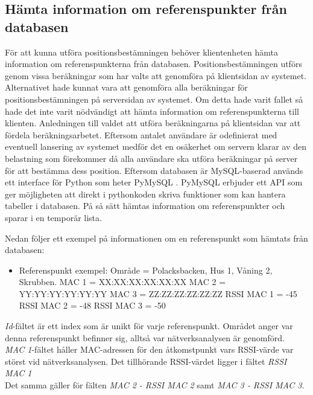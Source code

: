 \documentclass[swedish, a4paper,12pt]{article}
\begin{document}
\subsection{Hämta information om referenspunkter från databasen}\label{HamtaInfoDB}
För att kunna utföra positionsbestämningen behöver klientenheten hämta information om referenspunkterna från databasen. Positionsbestämningen utförs genom vissa beräkningar som har valts att genomföra på klientsidan av systemet. Alternativet hade kunnat vara att genomföra alla beräkningar för positionsbestämningen på serversidan av systemet. Om detta hade varit fallet så hade det inte varit nödvändigt att hämta information om referenspunkterna till klienten. Anledningen till valdet att utföra beräkningarna på klientsidan var att fördela beräkningsarbetet. Eftersom antalet användare är odefinierat med eventuell lansering av systemet medför det en osäkerhet om servern klarar av den belastning som förekommer då alla användare ska utföra beräkningar på server för att bestämma dess position. Eftersom databasen är MySQL-baserad används ett interface för Python som heter PyMySQL\cite{mysqldb}%
. PyMySQL erbjuder ett API som ger möjligheten att direkt i pythonkoden skriva funktioner som kan hantera tabeller i databasen. På så sätt hämtas information om referenspunkter och sparar i en temporär lista. %

Nedan följer ett exempel på informationen om en referenspunkt som hämtats från databasen:
\begin{itemize}
  \item Referenspunkt exempel:
        \newline Område = Polacksbacken, Hus 1, Våning 2, Skrubben.
        \newline MAC 1 = XX:XX:XX:XX:XX:XX
        \newline MAC 2 = YY:YY:YY:YY:YY:YY
        \newline MAC 3 = ZZ:ZZ:ZZ:ZZ:ZZ:ZZ
        \newline RSSI MAC 1 = -45
        \newline RSSI MAC 2 = -48
        \newline RSSI MAC 3 = -50
\end{itemize}

\textit{Id}-fältet är ett index som är unikt för varje referenspunkt. %
Området anger var denna referenspunkt befinner sig, alltså var nätverksanalysen är genomförd. \\
\textit{MAC 1}-fältet håller MAC-adressen för den åtkomstpunkt vars RSSI-värde var störst vid nätverksanalysen. Det tillhörande RSSI-värdet ligger i fältet \textit{RSSI MAC 1}\\
Det samma gäller för fälten \textit{MAC 2 - RSSI MAC 2} samt \textit{MAC 3 - RSSI MAC 3}.
\end{document}
